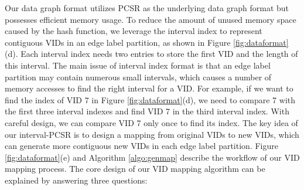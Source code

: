 Our data graph format utilizes PCSR as the underlying data graph format but possesses efficient memory usage. To reduce the amount of unused memory space caused by the hash function, we leverage the interval index to represent contiguous VIDs in an edge label partition, as shown in Figure \ref{fig:dataformat}(d). Each interval index needs two entries to store the first VID and the length of this interval. The main issue of interval index format is that an edge label partition may contain numerous small intervals, which causes a number of memory accesses to find the right interval for a VID. For example, if we want to find the index of VID 7 in Figure \ref{fig:dataformat}(d), we need to compare 7 with the first three interval indexes and find VID 7 in the third interval index. With careful design, we can compare VID 7 only once to find its index. The key idea of our interval-PCSR is to design a mapping from original VIDs to new VIDs, which can generate more contiguous new VIDs in each edge label partition. Figure \ref{fig:dataformat}(e) and Algorithm \ref{algo:genmap} describe the workflow of our VID mapping process. The core design of our VID mapping algorithm can be explained by answering three questions:
